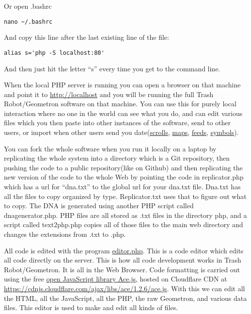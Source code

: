Or open .bashrc

\begin{verbatim}
nano ~/.bashrc
\end{verbatim}

And copy this line after the last existing line of the file:

\begin{verbatim}
alias s='php -S localhost:80'
\end{verbatim}

And then just hit the letter ``s'' every time you get to the command
line.

When the local PHP server is running you can open a browser on that
machine and point it to \href{http://localhost/}{http://localhost} and
you will be running the full Trash Robot/Geometron software on that
machine. You can use this for purely local interaction where no one in
the world can see what you do, and can edit various files which you then
paste into other instances of the software, send to other users, or
import when other users send you
date(\href{scrolls/scrolls.md}{scrolls}, \href{scrolls/maps.md}{maps},
\href{scrolls/feeds.md}{feeds}, \href{scrolls/geometron.md}{symbols}).

You can fork the whole software when you run it locally on a laptop by
replicating the whole system into a directory which is a Git repository,
then pushing the code to a public repository(like on Github) and then
replicating the new version of the code to the whole Web by pointing the
code in replicator.php which has a url for ``dna.txt'' to the global url
for your dna.txt file. Dna.txt has all the files to copy organized by
type. Replicator.txt uses that to figure out what to copy. The DNA is
generated using another PHP script called dnagenerator.php. PHP files
are all stored as .txt files in the directory php, and a script called
text2php.php copies all of those files to the main web directory and
changes the extensions from .txt to .php.

All code is edited with the program \url{editor.php}. This is a code
editor which edits all code directly on the server. This is how all code
development works in Trash Robot/Geometron. It is all in the Web
Browser. Code formatting is carried out using the free
\href{https://ace.c9.io/}{open JavaScript library Ace.js}, hosted on
Cloudflare CDN at
\url{https://cdnjs.cloudflare.com/ajax/libs/ace/1.2.6/ace.js}. With this
we can edit all the HTML, all the JavaScript, all the PHP, the raw
Geometron, and various data files. This editor is used to make and edit
all kinds of files.

